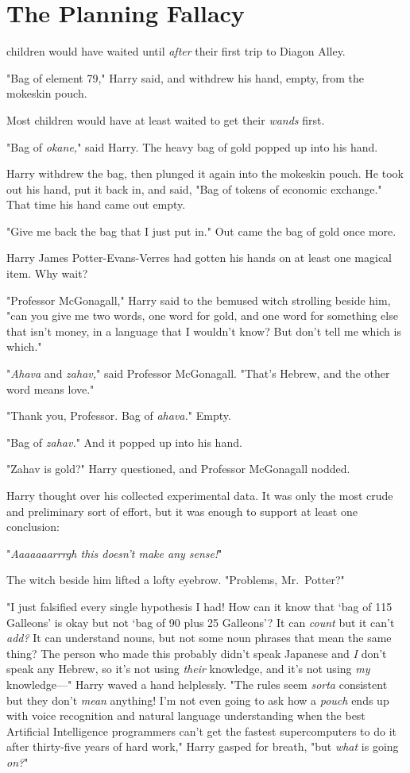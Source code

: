 \chapter{The Planning Fallacy}

 children would have waited until \emph{after} their first trip to 
Diagon Alley.

"Bag of element 79," Harry said, and withdrew his hand, empty, from the 
mokeskin pouch.

Most children would have at least waited to get their \emph{wands} first.

"Bag of \emph{okane,}" said Harry. The heavy bag of gold popped up into his 
hand.

Harry withdrew the bag, then plunged it again into the mokeskin pouch. He took 
out his hand, put it back in, and said, "Bag of tokens of economic exchange." 
That time his hand came out empty.

"Give me back the bag that I just put in." Out came the bag of gold once more.

Harry James Potter-Evans-Verres had gotten his hands on at least one magical 
item. Why wait?

"Professor McGonagall," Harry said to the bemused witch strolling beside him, 
"can you give me two words, one word for gold, and one word for something else 
that isn't money, in a language that I wouldn't know? But don't tell me which 
is which."

"\emph{Ahava} and \emph{zahav,}" said Professor McGonagall. "That's Hebrew, and 
the other word means love."

"Thank you, Professor. Bag of \emph{ahava.}" Empty.

"Bag of \emph{zahav.}" And it popped up into his hand.

"Zahav is gold?" Harry questioned, and Professor McGonagall nodded.

Harry thought over his collected experimental data. It was only the most crude 
and preliminary sort of effort, but it was enough to support at least one 
conclusion:

"\emph{Aaaaaaarrrgh this doesn't make any sense!}"

The witch beside him lifted a lofty eyebrow. "Problems, Mr.~Potter?"

"I just falsified every single hypothesis I had! How can it know that `bag of 
115 Galleons' is okay but not `bag of 90 plus 25 Galleons'? It can \emph{count} 
but it can't \emph{add?} It can understand nouns, but not some noun phrases 
that mean the same thing? The person who made this probably didn't speak 
Japanese and \emph{I} don't speak any Hebrew, so it's not using \emph{their} 
knowledge, and it's not using \emph{my} knowledge---" Harry waved a hand 
helplessly. "The rules seem \emph{sorta} consistent but they don't \emph{mean} 
anything! I'm not even going to ask how a \emph{pouch} ends up with voice 
recognition and natural language understanding when the best Artificial 
Intelligence programmers can't get the fastest supercomputers to do it after 
thirty-five years of hard work," Harry gasped for breath, "but \emph{what} is 
going \emph{on?}"

